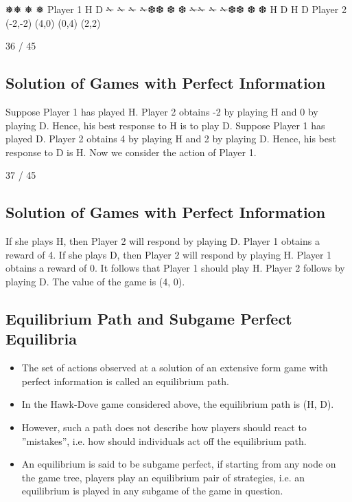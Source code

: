 \documentclass[]{report}
\begin{document}
❅❅
❅
❅
Player 1
H D
✁
✁
✁
✁❆❆
❆
❆ ✁✁
✁
✁❆❆
❆
❆
H D H D
Player 2
(-2,-2) (4,0) (0,4) (2,2)

36 / 45
\subsection{Solution of Games with Perfect Information}
Suppose Player 1 has played H. Player 2 obtains -2 by playing H
and 0 by playing D. Hence, his best response to H is to play D.
Suppose Player 1 has played D. Player 2 obtains 4 by playing H
and 2 by playing D. Hence, his best response to D is H.
Now we consider the action of Player 1.

37 / 45
\subsection{Solution of Games with Perfect Information}
If she plays H, then Player 2 will respond by playing D. Player 1
obtains a reward of 4.
If she plays D, then Player 2 will respond by playing H. Player 1
obtains a reward of 0.
It follows that Player 1 should play H. Player 2 follows by playing
D.
The value of the game is (4, 0).

\subsection{Equilibrium Path and Subgame Perfect Equilibria}
\begin{itemize}
\item The set of actions observed at a solution of an extensive form
	game with perfect information is called an equilibrium path.
\item In the Hawk-Dove game considered above, the equilibrium path is
	(H, D).
\item However, such a path does not describe how players should react to
	”mistakes”, i.e. how should individuals act off the equilibrium path.
\item An equilibrium is said to be subgame perfect, if starting from any
	node on the game tree, players play an equilibrium pair of
	strategies, i.e. an equilibrium is played in any subgame of the game
	in question.
\end{itemize}
\end{document}
